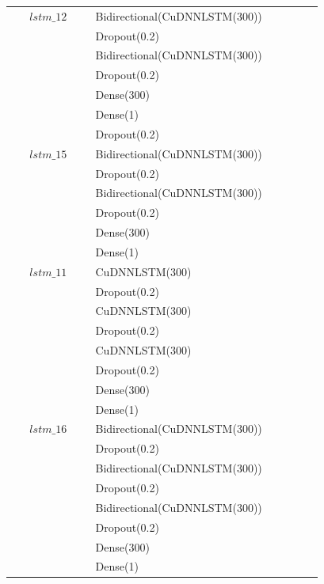 \begin{longtable}{| c | m{0.58\linewidth} | r | m{0.1\linewidth} |}
    $lstm\_12$  & Bidirectional(CuDNNLSTM(300)) \\
                & Dropout(0.2)                  \\
                & Bidirectional(CuDNNLSTM(300)) \\
                & Dropout(0.2)                  \\
                & Dense(300)                    \\
                & Dense(1)                      \\ \hline
                & Dropout(0.2)                  \\

    $lstm\_15$  & Bidirectional(CuDNNLSTM(300)) \\
                & Dropout(0.2)                  \\
                & Bidirectional(CuDNNLSTM(300)) \\
                & Dropout(0.2)                  \\
                & Dense(300)                    \\
                & Dense(1)                      \\ \hline

    $lstm\_11$  & CuDNNLSTM(300)                \\
                & Dropout(0.2)                  \\
                & CuDNNLSTM(300)                \\
                & Dropout(0.2)                  \\
                & CuDNNLSTM(300)                \\
                & Dropout(0.2)                  \\
                & Dense(300)                    \\
                & Dense(1)                      \\ \hline

    $lstm\_16$  & Bidirectional(CuDNNLSTM(300)) \\
                & Dropout(0.2)                  \\
                & Bidirectional(CuDNNLSTM(300)) \\
                & Dropout(0.2)                  \\
                & Bidirectional(CuDNNLSTM(300)) \\
                & Dropout(0.2)                  \\
                & Dense(300)                    \\
                & Dense(1)                      \\ \hline


\end{longtable}
